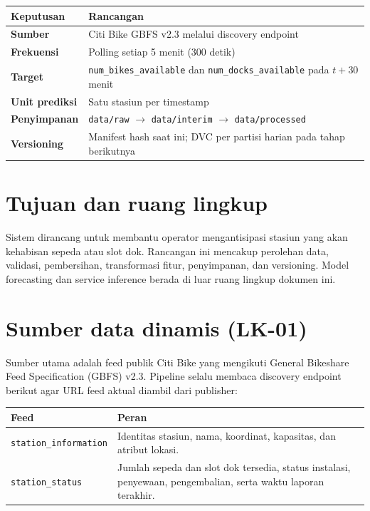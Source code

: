\documentclass[10pt,a4paper]{article}
\newcommand{\code}[1]{\texttt{#1}}
\begin{document}
\begin{center}
\begin{tabular}{>{\bfseries}p{} p{}}
\toprule
Keputusan & Rancangan \\
\midrule
Sumber & Citi Bike GBFS v2.3 melalui discovery endpoint \\
Frekuensi & Polling setiap 5 menit (300 detik) \\
Target & \code{num\_bikes\_available} dan \code{num\_docks\_available} pada $t+30$ menit \\
Unit prediksi & Satu stasiun per timestamp \\
Penyimpanan & \code{data/raw} $\rightarrow$ \code{data/interim} $\rightarrow$ \code{data/processed} \\
Versioning & Manifest hash saat ini; DVC per partisi harian pada tahap berikutnya \\
\bottomrule
\end{tabular}
\end{center}

\section{Tujuan dan ruang lingkup}
Sistem dirancang untuk membantu operator mengantisipasi stasiun yang akan
kehabisan sepeda atau slot dok. Rancangan ini mencakup perolehan data,
validasi, pembersihan, transformasi fitur, penyimpanan, dan versioning. Model
forecasting dan service inference berada di luar ruang lingkup dokumen ini.

\section{Sumber data dinamis (LK-01)}
Sumber utama adalah feed publik Citi Bike yang mengikuti General Bikeshare
Feed Specification (GBFS) v2.3. Pipeline selalu membaca discovery endpoint
berikut agar URL feed aktual diambil dari publisher:
\begin{center}
\end{center}

\begin{longtable}{@{}p{}p{}@{}}
\toprule
\textbf{Feed} & \textbf{Peran} \\
\midrule
\code{station\_information} & Identitas stasiun, nama, koordinat, kapasitas, dan atribut lokasi. \\
\code{station\_status} & Jumlah sepeda dan slot dok tersedia, status instalasi, penyewaan, pengembalian, serta waktu laporan terakhir. \\
\bottomrule
\end{longtable}
\end{document}
